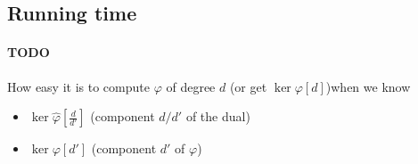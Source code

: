 \documentclass[12pt,a4paper]{article}
\begin{document}
					
				\subsection{Running time}
				\paragraph{TODO}
				How easy it is to compute $\varphi$ of degree $d$ (or get $\ker\varphi[d]$)when we know
				\begin{itemize}
					\item $\ker\widehat\varphi[\frac{d}{d'}]$ (component $d/d'$ of the dual)
					\item $\ker\varphi[d']$ (component $d'$ of $\varphi$)
				\end{itemize}













				
				
\end{document}
